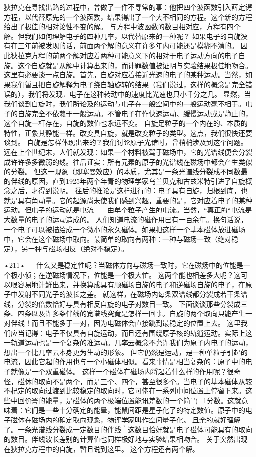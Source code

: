 狄拉克在寻找出路的过程中，曾做了一件不寻常的事：他把四个波函数引入薛定谔方程，以代替原先的一个波函数，结果得出了一个大不相同的方程。这个新的方程给出了极佳的相对论性不变的解。
与方程中波函数的数目相对应，方程有四个解。但我们如何理解电子的四种几率，以代替原来的一种呢？
如果电子的自旋没有在三年前被发现的话，前面两个解的意义在许多年内可能还是模糊不清的。
因此狄拉克方程的前两个解对应着两种可能意义下的相对于电子运动方向的电子自旋。这个自旋就是从解中计算出来的，而计罪数值被证明与实验结果极佳地吻合。
这里有必要谈一点自旋。首先，自旋对应着接近光速的电子的某种运动。当然，如果我们暂且把自旋解释为电子绕自轴旋转的结果（我们说过，这样的概念是完全错误的），我们将发现，电子在这种转动中的速度比光速也只小千分之几。
显然，当我们谈到自旋时，我们所论及的运动与电子在一般空间中的一般运动毫不相于。电子的自旋完全不依赖于一般运动。不管电子在作快速运动、缓慢运动或是静止的，这个自旋一杆存在，自旋的数值也永远不变。
自旋足粒子的一个内在的、本质的特性，正象其静能一样。改变具自旋，就是改变粒子的类型。这点，我们很快还要谈到。
自旋是怎样体现出来的？我们讨论原子光谙时，曾稍梢涉及到这个问题。远在上个世纪末，人们就发现：如果一个材料被驾于磁场中，它的光谱线便会分裂成许许多多微弱的线。往后证实：所有元素的原子的光谱线在磁场中都会产生类似的分裂。
但这一现象（即塞曼效应）的本质，尤其是一条光谱线分裂成不同数最的伴线的原因，直到1925年两个年青的物理学家乌兰贝克和古兹米特引进了自旋概念之后，才得到说明。
往后的推论是这样进行的：电子具有自旋，归根到底，也就是具有角动量。它的起源尚未使我们感到兴趣，重要的是，它对应着电子的某种运动。但电子的运动就是电流——由单个粒子产生的电流。当然，“真正的“电流是大数量的电子的运动造成的。
人们知道电流的磁作用已有一百余年。换句话说，一个电子可以被描绘成一个微小的永久磁体。如果把这样一个基本磁体放进磁场中，它会在这个磁场中取向。最简单的取向有两种：一种与磁场一致（绝对稳定），另一种与磁场相反（绝对不稳定）。

•211•
  
什么又是稳定性呢？当磁体方向与磁场一致时，它在磁炀中的位能是一个极小侦；在逆磁场情况下，位能是一个极大忙。
这两个能也相差多大呢？这可以哏容易地计鲜出来，并换算成具有顺磁场自旋的电子和逆磁场自旋的电子，在原子中发射不同光子的波长之差。
就这样，在磁场内每条双谱线都分裂成若干条谱线，分裂的倍数恰好与具有相反自旋的电子对数目一致。
下面谈谈那些分裂成三条、四条以及许多条伴线的宽谱线究竟是怎样一回事。自旋的两个取向只能产生一对伴线！而且不能多于一对，因为电磁体会直接跳到最稳定的位置上去。
这里我们应当记得：电子不仅具有自旋运动，而且还有围绕原子核的轨逍运动。实际上这一轨道运动也是一个复杂的准运动。几率云概念不允许我们为原子内电子的运动，想出一个比几率云本身更为生动的形象。
但它仍然是运动，是一种单粒子引起的电流，因此它起的作用也与一个小磁体相似。看来事情是相当复杂的：原子中的电子就像是一个双重磁体。
这样一个磁体在磁场内将起着什么样的作用呢？很奇怪，磁休的取向不是两个，而是三个、四个，甚至很多个。当电子的基本磁体从较不杞定的取向过渡到比较稳定的取向时，它可佬在一系列巾间位置上停留下来。这些中回价詈的能量，是磁体的两个极端位置能讯差数的一个简1'(_1分数。这就意味着：它们是一些十分确定的能晕，能鼠间距是星子化了的特定数值。原子中的电子磁体在磁场内的确定取向现象，物评学家叫作空间量子化。
且余的就好理解了。一条光谱线分裂成一定数目的伴线｀这数目恰好就是电子磁体可能具有的取向的数目。伴线波长差别的计算值也同样极好地与实验结果相吻合。
关于突然出现在狄拉克方程中的自旋，暂且说到这里。
这个方程还有两个解。

